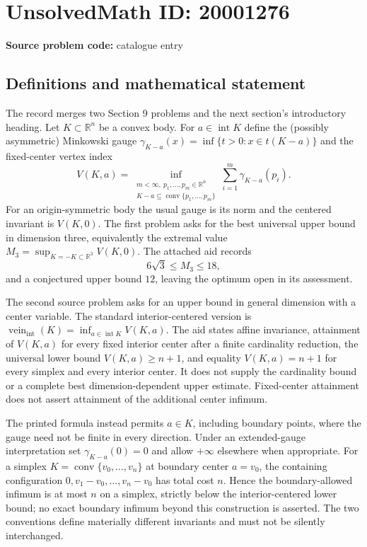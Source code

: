 \documentclass[11pt]{article}
\newcommand{\R}{\mathbb{R}}
\begin{document}
\section*{UnsolvedMath ID: 20001276}
\textbf{Source problem code:} catalogue entry
\subsection{Definitions and mathematical statement}
The record merges two Section 9 problems and the next section's introductory heading. Let $K\subset\R^n$ be a convex body. For $a\in\operatorname{int}K$ define the (possibly asymmetric) Minkowski gauge $\gamma_{K-a}(x)=\inf\{t>0:x\in t(K-a)\}$ and the fixed-center vertex index
\[
V(K,a)=\inf_{\substack{m<\infty,\ p_1,\ldots,p_m\in\R^n\\K-a\subseteq\operatorname{conv}\{p_1,\ldots,p_m\}}}
\sum_{i=1}^m\gamma_{K-a}(p_i).
\]
For an origin-symmetric body the usual gauge is its norm and the centered invariant is $V(K,0)$. The first problem asks for the best universal upper bound in dimension three, equivalently the extremal value $M_3=\sup_{K=-K\subset\R^3}V(K,0)$. The attached aid records
\[
6\sqrt3\le M_3\le18,
\]
and a conjectured upper bound $12$, leaving the optimum open in its assessment.

The second source problem asks for an upper bound in general dimension with a center variable. The standard interior-centered version is $\operatorname{vein}_{\mathrm{int}}(K)=\inf_{a\in\operatorname{int}K}V(K,a)$. The aid states affine invariance, attainment of $V(K,a)$ for every fixed interior center after a finite cardinality reduction, the universal lower bound $V(K,a)\ge n+1$, and equality $V(K,a)=n+1$ for every simplex and every interior center. It does not supply the cardinality bound or a complete best dimension-dependent upper estimate. Fixed-center attainment does not assert attainment of the additional center infimum.

The printed formula instead permits $a\in K$, including boundary points, where the gauge need not be finite in every direction. Under an extended-gauge interpretation set $\gamma_{K-a}(0)=0$ and allow $+\infty$ elsewhere when appropriate. For a simplex $K=\operatorname{conv}\{v_0,\ldots,v_n\}$ at boundary center $a=v_0$, the containing configuration $0,v_1-v_0,\ldots,v_n-v_0$ has total cost $n$. Hence the boundary-allowed infimum is at most $n$ on a simplex, strictly below the interior-centered lower bound; no exact boundary infimum beyond this construction is asserted. The two conventions define materially different invariants and must not be silently interchanged.
\end{document}
